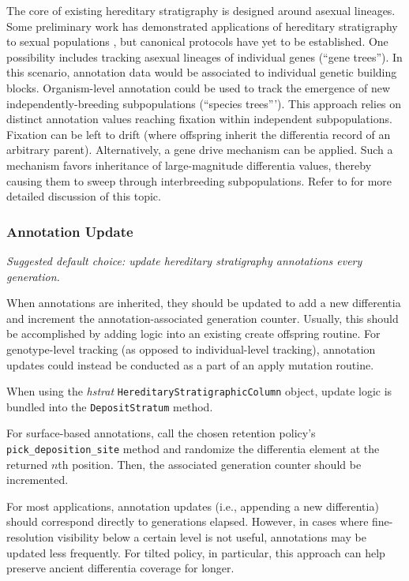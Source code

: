 The core of existing hereditary stratigraphy is designed around asexual lineages.
Some preliminary work has demonstrated applications of hereditary stratigraphy to sexual populations \citep{moreno2024methods}, but canonical protocols have yet to be established.
One possibility includes tracking asexual lineages of individual genes (``gene trees'').
In this scenario, annotation data would be associated to individual genetic building blocks.
Organism-level annotation could be used to track the emergence of new independently-breeding subpopulations (``species trees''').
This approach relies on distinct annotation values reaching fixation within independent subpopulations.
Fixation can be left to drift (where offspring inherit the differentia record of an arbitrary parent).
Alternatively, a gene drive mechanism can be applied.
Such a mechanism favors inheritance of large-magnitude differentia values, thereby causing them to sweep through interbreeding subpopulations.
Refer to \citet{moreno2024methods} for more detailed discussion of this topic.

\subsubsection{Annotation Update}
\textit{Suggested default choice: update hereditary stratigraphy annotations every generation.}

When annotations are inherited, they should be updated to add a new differentia and increment the annotation-associated generation counter.
Usually, this should be accomplished by adding logic into an existing create offspring routine.
For genotype-level tracking (as opposed to individual-level tracking), annotation updates could instead be conducted as a part of an apply mutation routine.

When using the \textit{hstrat} \texttt{HereditaryStratigraphicColumn} object, update logic is bundled into the \texttt{DepositStratum} method.

For surface-based annotations, call the chosen retention policy's \texttt{pick\_deposition\_site} method and randomize the differentia element at the returned $n$th position.
Then, the associated generation counter should be incremented.

For most applications, annotation updates (i.e., appending a new differentia) should correspond directly to generations elapsed.
However, in cases where fine-resolution visibility below a certain level is not useful, annotations may be updated less frequently.
For tilted policy, in particular, this approach can help preserve ancient differentia coverage for longer.

